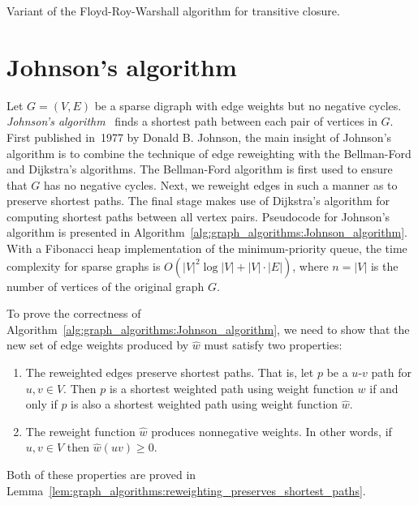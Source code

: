 \begin{algorithm}[!htpb]

\caption{Variant of the Floyd-Roy-Warshall algorithm for transitive closure.}
\label{alg:graph_algorithms:Floy_Roy_Warshall:transitive_closure}
\end{algorithm}



\section{Johnson's algorithm}

Let $G = (V,E)$ be a sparse digraph with edge
weights but no negative cycles.
\emph{Johnson's algorithm}~\cite{Johnson1977}
finds a shortest path between each pair of vertices in $G$. First
published in~1977 by Donald B. Johnson, the
main insight of Johnson's algorithm is to
combine the technique of edge reweighting with the
Bellman-Ford and
Dijkstra's algorithms. The Bellman-Ford
algorithm is first used to ensure that $G$ has no negative
cycles. Next, we reweight edges
in such a manner as to preserve shortest
paths. The final stage makes use of Dijkstra's
algorithm for computing shortest paths between all vertex
pairs. Pseudocode for Johnson's algorithm is presented in
Algorithm~\ref{alg:graph_algorithms:Johnson_algorithm}. With a
Fibonacci heap implementation of the
minimum-priority queue, the time
complexity for sparse graphs is
$O(|V|^2 \log |V| + |V| \cdot |E|)$, where $n = |V|$ is the number of
vertices of the original graph $G$.

To prove the correctness of
Algorithm~\ref{alg:graph_algorithms:Johnson_algorithm}, we need to
show that the new set of edge weights produced by $\hat{w}$ must
satisfy two properties:
\begin{enumerate}
\item The reweighted edges preserve shortest
  paths. That is, let $p$ be a $u$-$v$ path for $u,v \in V$. Then $p$
  is a shortest weighted path
  using weight function $w$ if and only if $p$ is also a shortest
  weighted path using weight function $\hat{w}$.

\item The reweight function $\hat{w}$ produces nonnegative
  weights. In other words, if $u,v \in V$
  then $\hat{w}(uv) \geq 0$.
\end{enumerate}
Both of these properties are proved in
Lemma~\ref{lem:graph_algorithms:reweighting_preserves_shortest_paths}.

